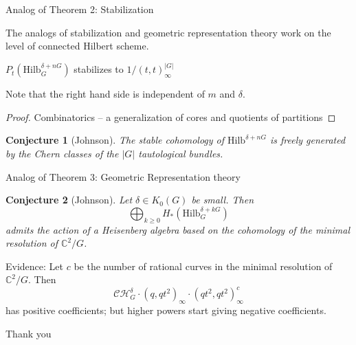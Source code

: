 \documentclass{beamer}
\newcommand{\Hilb}{\textrm{Hilb}}
\newcommand{\C}{\mathbb{C}}
\newtheorem{conjecture}{Conjecture}
\begin{document}
\begin{frame}{Analog of Theorem 2: Stabilization}

The analogs of stabilization and geometric representation theory work on the level of connected Hilbert scheme.

\begin{Theorem}[Johnson]
$P_t(\Hilb^{\delta+nG}_G)$ stabilizes to $1/(t,t)_\infty^{|G|}$
\end{Theorem}
Note that the right hand side is independent of $m$ and $\delta$.
\begin{proof} Combinatorics -- a generalization of cores and quotients of partitions \end{proof}

\begin{conjecture}[Johnson]
The stable cohomology of $\Hilb^{\delta+nG}$ is freely generated by the Chern classes of the $|G|$ tautological bundles.
\end{conjecture}

\end{frame}

\begin{frame}{Analog of Theorem 3: Geometric Representation theory}


\begin{conjecture}[Johnson]
Let $\delta\in K_0(G)$ be small.  Then
$$\bigoplus_{k\geq 0} H_*(\Hilb^{\delta+kG}_G)$$ admits the action of a Heisenberg algebra based on the cohomology of the minimal resolution of $\C^2/G$.
\end{conjecture}
\begin{block}{Evidence:}
Let $c$ be the number of rational curves in the minimal resolution of $\C^2/G$.  Then
$$\mathcal{CH}^\delta_G\cdot(q,qt^2)_\infty\cdot (qt^2,qt^2)_\infty^c$$
has positive coefficients; but higher powers start giving negative coefficients.

\end{block}

\end{frame}






\begin{frame}[plain,c]

\begin{center}

\Huge

Thank you

\end{center}

\end{frame}
\end{document}
